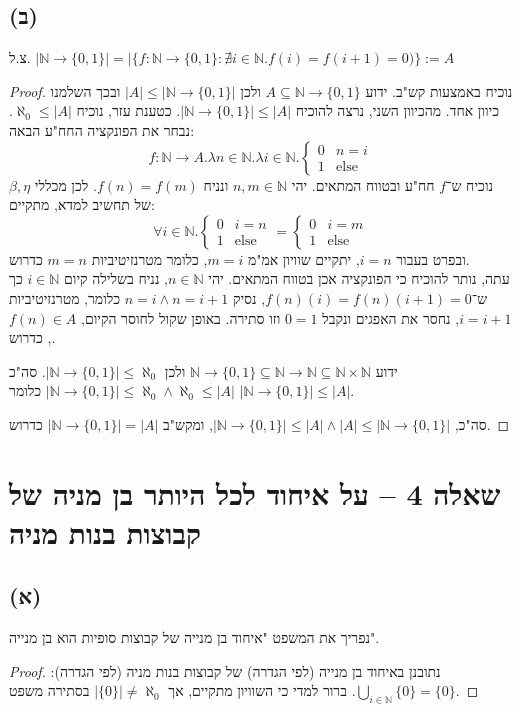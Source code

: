 \documentclass[]{article}
\newcommand\N     {\mathbb{N}}
\newcommand\other {\text{else}}
\newcommand\az    {\aleph_0}
\begin{document}
	\subsection*{(ב)}
	צ.ל.
	$ |\N \to \{0, 1\}| = |\{f \colon \N \to \{0, 1\} \colon \nexists i \in \N. f(i) = f(i + 1) = 0)\} := A$
	\begin{proof}
		נוכיח באמצעות קש"ב. ידוע $ A \subseteq \N \to \{0, 1\} $ ולכן $ |A| \le |\N \to \{0, 1\}| $ ובכך השלמנו כיוון אחד. מהכיוון השני, נרצה להוכיח $ |\N \to \{0, 1\}| \le |A| $. כטענת עזר, נוכיח $ \az \le |A| $. נבחר את הפונקציה החח"ע הבאה: 
		\[ f \colon \N \to A.  \lambda n \in \N. \lambda i \in \N. \begin{cases}
			0 & n = i \\
			1 &\other
		\end{cases} \]
	נוכיח ש־$ f $ חח"ע ובטווח המתאים. יהי $ n, m \in \N $ ונניח $ f(n) = f(m) $. לכן מכללי $ \beta, \eta $ של תחשיב למדא, מתקיים:
	\[ \forall i \in \N. \begin{cases}
		0 & i = n \\
		1 &\other 
	\end{cases} = \begin{cases}
		0 & i = m \\
		1 &\other
	\end{cases} \]
	ובפרט בעבור $ i = n $, יתקיים שוויון אמ"מ $ m = i $, כלומר מטרנזיטיביות $ m = n $ כדרוש. \\
	עתה, נותר להוכיח כי הפונקציה אכן בטווח המתאים. יהי $ n \in \N $, נניח בשלילה קיום $ i \in \N $ כך ש־$ f(n)(i) = f(n)(i + 1) = 0 $, נסיק $ n = i \land n = i + 1 $ כלומר, מטרנזיטיביות $ i  = i + 1 $, נחסר את האפגים ונקבל $ 0 = 1 $ וזו סתירה. באופן שקול לחוסר הקיום, $ f(n) \in A $, כדרוש. 
	
ידוע $ \N \to \{0, 1\} \subseteq \N \to \N \subseteq \N \times \N $ ולכן $ |\N \to \{0, 1\}| \le \az $. סה"כ $ |\N \to \{0, 1\}| \le \az \land \az \le |A| $ כלומר $ |\N \to \{0, 1\}| \le |A| $. 

סה"כ, $ |\N \to \{0, 1\}| \le |A| \land |A| \le |\N \to \{0, 1\}| $, ומקש"ב $ |\N \to \{0, 1\}| = |A| $ כדרוש. 
	\end{proof}

	\section*{שאלה 4 – על איחוד לכל היותר בן מניה של קבוצות בנות מניה}
	\subsection*{(א)}
	נפריך את המשפט "איחוד בן מנייה של קבוצות סופיות הוא בן מנייה". 
	\begin{proof}
	נתובנן באיחוד בן מנייה (לפי הגדרה) של קבוצות בנות מניה (לפי הגדרה): $ \bigcup_{i \in \N} \{0\}  = \{0\} $. ברור למדי כי השוויון מתקיים, אך $ |\{0\}| \neq \az $ בסתירה משפט. 
	\end{proof}
\end{document}
